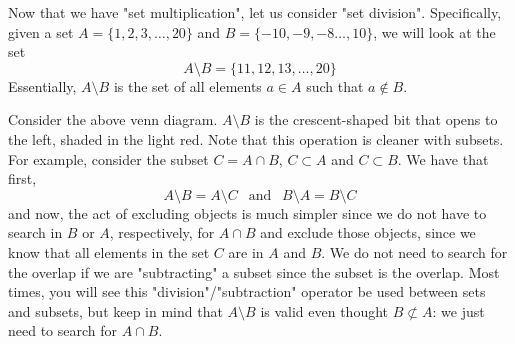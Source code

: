 Now that we have "set multiplication", let us consider "set division". Specifically, given a set $A = \{ 1, 2, 3, \ldots, 20\}$ and $B = \{-10, -9, -8 \ldots, 10 \}$, we will look at the set 
\[
A \setminus B = \{11, 12,13, \ldots, 20 \}
\]
Essentially, $A \setminus B$ is the set of all elements $a \in A$ such that $a \notin B$. 
\begin{center}
\end{center}
Consider the above venn diagram. $A \setminus B$ is the crescent-shaped bit that opens to the left, shaded in the light red. Note that this operation is cleaner with subsets. For example, consider the subset $C = A \cap B$, $C \subset A$ and $C \subset B$. We have that first,
\[
A \setminus B = A \setminus C ~~\text{  and  }~~ B \setminus A = B \setminus C
\]
and now, the act of excluding objects is much simpler since we do not have to search in $B$ or $A$, respectively, for $A \cap B$ and exclude those objects, since we know that all elements in the set $C$ are in $A$ and $B$. We do not need to search for the overlap if we are "subtracting" a subset since the subset is the overlap. Most times, you will see this "division"/"subtraction" operator be used between sets and subsets, but keep in mind that $A \setminus B$ is valid even thought $B \not\subset A$: we just need to search for $A \cap B$. 

